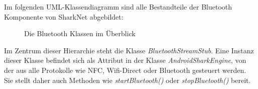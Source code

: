 Im folgenden UML-Klassendiagramm sind alle Bestandteile der Bluetooth Komponente von SharkNet abgebildet:
\vspace*{-2em}
\begin{figure}[H]
	\centering
	\caption{Die Bluetooth Klassen im Überblick}
	\label{fig:bluetoothAll}
\end{figure}
Im Zentrum dieser Hierarchie steht die Klasse \textit{BluetoothStreamStub}. Eine Instanz dieser Klasse befindet sich als Attribut in der Klasse \textit{AndroidSharkEngine}, von der aus alle Protokolle wie NFC, Wifi-Direct oder Bluetooth gesteuert werden. Sie stellt daher auch Methoden wie \textit{startBluetooth()} oder \textit{stopBluetooth()} bereit.
\newpage 





\label{ch:bluetoothinterfaces}

